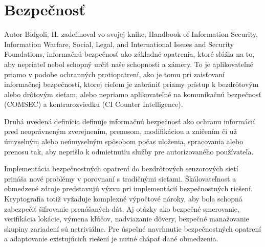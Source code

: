 \documentclass[12pt,a4paper,oneside,openright]{report}
\begin{document}
%

\section{Bezpečnosť}  \label{s_security}
Autor Bidgoli, H. zadefinoval vo svojej knihe, Handbook of Information Security, Information Warfare, Social, Legal, and International Issues and Security Foundations\cite{bidgoli2006handbook}, informačnú bezpečnosť ako základné opatrenia, ktoré slúžia na to, aby nepriateľ nebol schopný určiť naše schopnosti a zámery. To je aplikovateľné priamo v podobe ochranných protiopatrení, ako je tomu pri zaisťovaní informačnej bezpečnosti, ktorej cieľom je zabrániť priamy prístup k bezdrôtovým alebo drôtovým sieťam, alebo nepriamo aplikovateľné na komunikačnú bezpečnosť (COMSEC) a kontrarozviedku (CI Counter Intelligence).

Druhá uvedená definícia definuje informačnú bezpečnosť ako ochranu informácií pred neoprávneným zverejnením, prenosom, modifikáciou a zničením či už úmyselným alebo neúmyselným spôsobom počas uloženia, spracovania alebo prenosu tak, aby neprišlo k odmietnutiu služby pre autorizovaného používateľa.\cite{bidgoli2006handbook}

Implementácia bezpečnostných opatrení do bezdrôtových senzorových sietí prináša nové problémy v porovnaní s tradičnými sieťami. Škálovateľnosť a obmedzené zdroje predstavujú výzvu pri implementácií bezpečnostných riešení. Kryptografia totiž vyžaduje komplexné výpočtové nároky, aby bola schopná zabezpečiť šifrovanie prenášaných dát. Aj otázky ako bezpečné smerovanie, verifikácia lokácie, výmena kľúčov, nadviazanie dôvery, bezpečné manažovanie skupiny zariadení sú netriviálne.
Pre úspešné navrhnutie bezpečnostných opatrení a adaptovanie existujúcich riešení je nutné chápať dané obmedzenia\cite{bidgoli2006handbook}.
\end{document}
